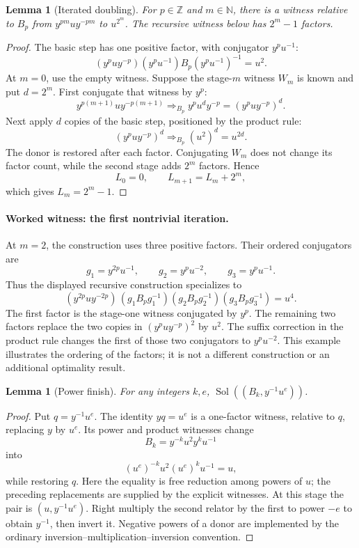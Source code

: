 \documentclass[11pt]{article}
\newtheorem{lemma}[theorem]{Lemma}
\theoremstyle{definition}\newtheorem{definition}[theorem]{Definition}
\theoremstyle{remark}\newtheorem{remark}[theorem]{Remark}
\newcommand{\Sol}{\operatorname{Sol}}
\newcommand{\wit}[1]{\mathrel{\Longrightarrow_{#1}}}
\begin{document}
\begin{lemma}[Iterated doubling]\label{lem:double}
For $p\in\mathbb Z$ and $m\in\mathbb N$, there is a witness relative to $B_p$ from $y^{pm}uy^{-pm}$ to $u^{2^m}$. The recursive witness below has $2^m-1$ factors.
\end{lemma}
\begin{proof}
The basic step has one positive factor, with conjugator $y^pu^{-1}$:
\[
(y^puy^{-p})(y^pu^{-1})B_p(y^pu^{-1})^{-1}=u^2.
\]
At $m=0$, use the empty witness. Suppose the stage-$m$ witness $W_m$ is known and put $d=2^m$. First conjugate that witness by $y^p$:
\[
y^{p(m+1)}uy^{-p(m+1)}\wit{B_p}y^pu^dy^{-p}=(y^puy^{-p})^d.
\]
Next apply $d$ copies of the basic step, positioned by the product rule:
\[
(y^puy^{-p})^d\wit{B_p}(u^2)^d=u^{2d}.
\]
The donor is restored after each factor. Conjugating $W_m$ does not change its factor count, while the second stage adds $2^m$ factors. Hence
\[
L_0=0,\qquad L_{m+1}=L_m+2^m,
\]
which gives $L_m=2^m-1$.
\end{proof}

\paragraph{Worked witness: the first nontrivial iteration.}
At $m=2$, the construction uses three positive factors. Their ordered conjugators are
\[
g_1=y^{2p}u^{-1},\qquad g_2=y^pu^{-2},\qquad g_3=y^pu^{-1}.
\]
Thus the displayed recursive construction specializes to
\[
(y^{2p}uy^{-2p})\,(g_1B_pg_1^{-1})
(g_2B_pg_2^{-1})(g_3B_pg_3^{-1})=u^4.
\]
The first factor is the stage-one witness conjugated by $y^p$. The remaining two factors replace the two copies in $(y^puy^{-p})^2$ by $u^2$. The suffix correction in the product rule changes the first of those two conjugators to $y^pu^{-2}$. This example illustrates the ordering of the factors; it is not a different construction or an additional optimality result.

\begin{lemma}[Power finish]\label{lem:power}
For any integers $k,e$, $\Sol((B_k,y^{-1}u^e))$.
\end{lemma}
\begin{proof}
Put $q=y^{-1}u^e$. The identity $yq=u^e$ is a one-factor witness, relative to $q$, replacing $y$ by $u^e$. Its power and product witnesses change
\[
B_k=y^{-k}u^2y^ku^{-1}
\]
into
\[
(u^e)^{-k}u^2(u^e)^k u^{-1}=u,
\]
while restoring $q$. Here the equality is free reduction among powers of $u$; the preceding replacements are supplied by the explicit witnesses. At this stage the pair is $(u,y^{-1}u^e)$. Right multiply the second relator by the first to power $-e$ to obtain $y^{-1}$, then invert it. Negative powers of a donor are implemented by the ordinary inversion--multiplication--inversion convention.
\end{proof}
\end{document}
